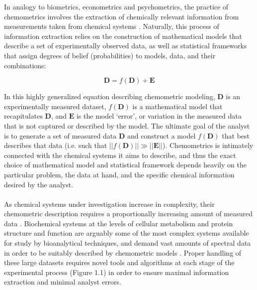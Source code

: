 \begin{doublespace}
In analogy to biometrics, econometrics and psychometrics, the practice of
chemometrics involves the extraction of chemically relevant information from
measurements taken from chemical systems \cite{wold:cils1995}.
Naturally, this process of information extraction relies on the construction of
mathematical models that describe a set of experimentally observed data, as
well as statistical frameworks that assign degrees of belief (probabilities)
to models, data, and their combinations:

\begin{equation*}
\mathbf{D} = f(\mathbf{D}) + \mathbf{E}
\end{equation*}

In this highly generalized equation describing chemometric modeling,
$\mathbf{D}$ is an experimentally measured dataset, $f(\mathbf{D})$ is
a mathematical model that recapitulates $\mathbf{D}$, and $\mathbf{E}$ is
the model `error', or variation in the measured data that is not
captured or described by the model. The ultimate goal of the analyst is to
generate a set of measured data $\mathbf{D}$ and construct a model
$f(\mathbf{D})$ that best describes that data (i.e. such that
$||f(\mathbf{D})|| \gg ||\mathbf{E}||$). Chemometrics is intimately connected
with the chemical systems it aims to describe, and thus the exact choice
of mathematical model and statistical framework depends heavily on the
particular problem, the data at hand, and the specific chemical information
desired by the analyst.
\\\\
As chemical systems under investigation increase in complexity, their
chemometric description requires a proportionally increasing amount of
measured data \cite{wold:cils1995}. Biochemical systems at the
levels of cellular metabolism and protein structure and function are
arguably some of the most complex systems available for study by
bioanalytical techniques, and demand vast amounts of spectral data
in order to be suitably described by chemometric models
\cite{
  wutrich:jmolb1982,
  kay:jmr2005,
  lindon:cmr2000,
  chen:rcms2006,
  han:metab2008,
  barding:jacs2012,
  baker:mmbio2012,
  marshall:metab2015}. Proper handling of these large datasets requires novel
tools and algorithms at each stage of the experimental process (Figure 1.1) in
order to ensure maximal information extraction and minimal analyst errors.
\end{doublespace}

